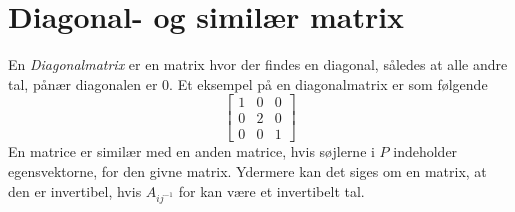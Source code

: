 \section{Diagonal- og similær matrix}
En \textit{Diagonalmatrix} er en matrix hvor der findes en diagonal, således at alle andre tal, pånær diagonalen er 0.
Et eksempel på en diagonalmatrix er som følgende
\begin{equation}
\left[
    \begin{matrix}
        1&0&0\\
        0&2&0\\
        0&0&1
    \end{matrix}
\right]
\end{equation}
En matrice er similær med en anden matrice, hvis søjlerne i $P$ indeholder egensvektorne, for den givne matrix.
Ydermere kan det siges om en matrix, at den er invertibel, hvis $A_{ij^{-1}}$ for kan være et invertibelt tal.
